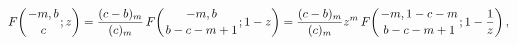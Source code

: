 \[\mathop{F\/}\nolimits\!\left({-m,b\atop c};z\right)=\frac{(c-b)_{m}}{(c)_{m}}%
\mathop{F\/}\nolimits\!\left({-m,b\atop b-c-m+1};1-z\right)=\frac{(c-b)_{m}}{(%
c)_{m}}z^{m}\mathop{F\/}\nolimits\!\left({-m,1-c-m\atop b-c-m+1};1-\frac{1}{z}%
\right),\]